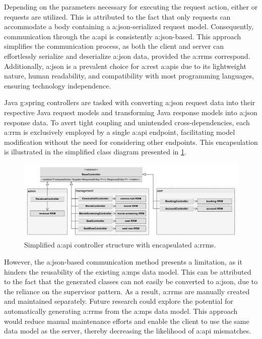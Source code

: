 Depending on the parameters necessary for executing the request action, either  or  requests are utilized. This is attributed to the fact that only  requests can accommodate a body containing a \gls{a:json}-serialized request model. Consequently, communication through the \gls{a:api} is consistently \gls{a:json}-based. This approach simplifies the communication process, as both the client and server can effortlessly serialize and deserialize \gls{a:json} data, provided the \glspl{a:rrm} correspond. Additionally, \gls{a:json} is a prevalent choice for \gls{a:rest} \glspl{a:api} due to its lightweight nature, human readability, and compatibility with most programming languages, ensuring technology independence.

Java \gls{g:spring} controllers are tasked with converting \gls{a:json} request data into their respective Java request models and transforming Java response models into \gls{a:json} response data. To avert tight coupling and unintended cross-dependencies, each \gls{a:rrm} is exclusively employed by a single \gls{a:api} endpoint, facilitating model modification without the need for considering other endpoints. This encapsulation is illustrated in the simplified class diagram presented in \cref{fig:api-controllers}.

\begin{figure}[H]
\centering
\includegraphics[width=\textwidth]{images/api-controllers}
\caption{Simplified \gls{a:api} controller structure with encapsulated \glspl{a:rrm}.}
\label{fig:api-controllers}
\end{figure}

However, the \gls{a:json}-based communication method presents a limitation, as it hinders the reusability of the existing \gls{a:mps} data model. This can be attributed to the fact that the generated classes can not easily be converted to \gls{a:json}, due to the reliance on the supervisor pattern. As a result, \glspl{a:rrm} are manually created and maintained separately. Future research could explore the potential for automatically generating \glspl{a:rrm} from the \gls{a:mps} data model. This approach would reduce manual maintenance efforts and enable the client to use the same data model as the server, thereby decreasing the likelihood of \gls{a:api} mismatches.

